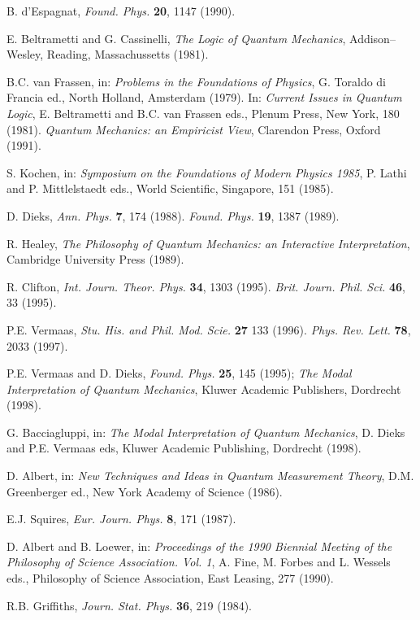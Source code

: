 \documentclass[12pt]{article}
\begin{document}
\begin{thebibliography}{999}
 B. d'Espagnat, {\it Found. Phys.} {\bf 20}, 1147
(1990).

 E. Beltrametti and G. Cassinelli, {\it The Logic of
Quantum Mechanics}, Addison--Wesley, Reading, Massachussetts
(1981).

 B.C. van Frassen, in: {\it Problems in the
Foundations of Physics}, G. Toraldo di Francia ed., North Holland,
Amsterdam (1979). In: {\it Current Issues in Quantum Logic}, E.
Beltrametti and B.C. van Frassen eds., Plenum Press, New York, 180
(1981). {\it Quantum Mechanics: an Empiricist View}, Clarendon
Press, Oxford (1991).

 S. Kochen, in: {\it Symposium on the Foundations of
Modern Physics 1985}, P. Lathi and P. Mittlelstaedt eds., World
Scientific, Singapore, 151 (1985).

 D. Dieks, {\it Ann. Phys.} {\bf 7}, 174 (1988).
{\it Found. Phys.} {\bf 19}, 1387 (1989).

 R. Healey, {\it The Philosophy of Quantum
Mechanics: an Interactive Interpretation}, Cambridge University
Press (1989).

 R. Clifton, {\it Int. Journ. Theor. Phys.} {\bf
34}, 1303 (1995). {\it Brit. Journ. Phil. Sci.} {\bf 46}, 33
(1995).

 P.E. Vermaas, {\it Stu. His. and Phil. Mod. Scie.}
{\bf 27} 133 (1996). {\it Phys. Rev. Lett.} {\bf 78}, 2033 (1997).

 P.E. Vermaas and D. Dieks, {\it Found. Phys.} {\bf
25}, 145 (1995); {\it The Modal Interpretation of Quantum
Mechanics}, Kluwer Academic Publishers, Dordrecht (1998).

 G. Bacciagluppi, in: {\it The Modal Interpretation of
Quantum Mechanics}, D. Dieks and P.E. Vermaas eds, Kluwer Academic
Publishing, Dordrecht (1998).

 D. Albert, in: {\it New Techniques and Ideas in
Quantum Measurement Theory}, D.M. Greenberger ed., New York
Academy of Science (1986).

 E.J. Squires, {\it Eur. Journ. Phys.} {\bf 8}, 171
(1987).

 D. Albert and B. Loewer, in:  {\it Proceedings of
the 1990 Biennial Meeting of the Philosophy of Science
Association. Vol. 1}, A. Fine, M. Forbes and L. Wessels eds.,
Philosophy of Science Association, East Leasing, 277 (1990).

 R.B. Griffiths, {\it Journ. Stat. Phys.} {\bf 36},
219 (1984).


\end{thebibliography}
\end{document}
